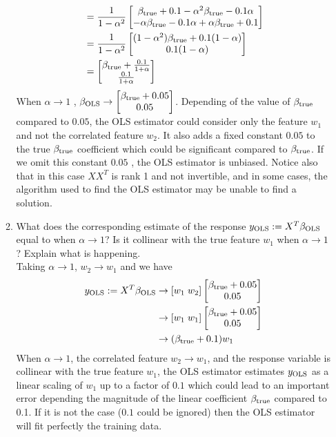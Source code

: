 \documentclass[12pt,twoside]{article}
\begin{document}
\begin{enumerate}
\begin{enumerate}
\begin{align*}
						&= 	\frac{1}{1-\alpha^2}  \begin{bmatrix} \beta_{\operatorname{true}} + 0.1 -\alpha^2 \beta_{\operatorname{true}} -0.1 \alpha \\ -\alpha \beta_{\operatorname{true}} -0.1 \alpha + \alpha \beta_{\operatorname{true}}  + 0.1 \end{bmatrix} \\
						&=	\frac{1}{1-\alpha^2}  \begin{bmatrix} (1-\alpha^2)  \beta_{\operatorname{true}} + 0.1 (1-\alpha) \\ 0.1 (1 - \alpha) \end{bmatrix} \\
						&=  	\begin{bmatrix} \beta_{\operatorname{true}} + \frac{0.1} {1 + \alpha} \\ \frac{0.1} {1 + \alpha} \end{bmatrix}
\end{align*}
When $\alpha \rightarrow 1$ , $\beta_{\operatorname{OLS}} \rightarrow   \begin{bmatrix} \beta_{\operatorname{true}} + 0.05  \\ 0.05 \end{bmatrix}$.
Depending of the value of $\beta_{\operatorname{true}}$ compared to $0.05$, the OLS estimator could consider only the feature $w_1$ and not the correlated feature $w_2$.
It also  adds a fixed constant $0.05$ to the true $\beta_{\operatorname{true}}$ coefficient which could be significant compared to
 $\beta_{\operatorname{true}}$. If we omit this constant  $0.05$ ,  the OLS estimator is unbiased. 
 Notice also that in this case $XX^T$ is rank 1 and not invertible, and in some cases, the algorithm used to find the OLS estimator may be unable to find a solution.
    
   \item  What does the corresponding estimate of the response $y_{\operatorname{OLS}} := X^T\beta_{\operatorname{OLS}}$ equal to when $\alpha \rightarrow 1$? Is it collinear with the true feature $w_1$ when $\alpha \rightarrow 1$? Explain what is happening.\\
   
  \medskip
  Taking $\alpha \rightarrow 1$, $w_2 \rightarrow w_1$ and we have 
  \begin{align*}
	  y_{\operatorname{OLS}} := X^T\beta_{\operatorname{OLS}}	&\rightarrow [w_1 \; w_2]  \begin{bmatrix} \beta_{\operatorname{true}} + 0.05  \\ 0.05 \end{bmatrix} \\
	  								&\rightarrow [w_1 \; w_1] \begin{bmatrix} \beta_{\operatorname{true}} + 0.05  \\ 0.05 \end{bmatrix} \\
									&\rightarrow ( \beta_{\operatorname{true}} + 0.1) w_1
  \end{align*}
  When $\alpha \rightarrow 1$, the correlated feature $w_2 \rightarrow w_1$, and the response variable is collinear with the true feature $w_1$, the OLS estimator estimates $y_{\operatorname{OLS}}$ as a linear scaling of $w_1$ 
  up to a factor of $0.1$ which could lead to an important error depending the magnitude of the linear coefficient  $\beta_{\operatorname{true}}$ compared to 0.1. If it is not the case ($0.1$ could be ignored) 
  then the OLS estimator will fit perfectly the training data.
    

\end{enumerate}
\end{enumerate}
\end{document}
